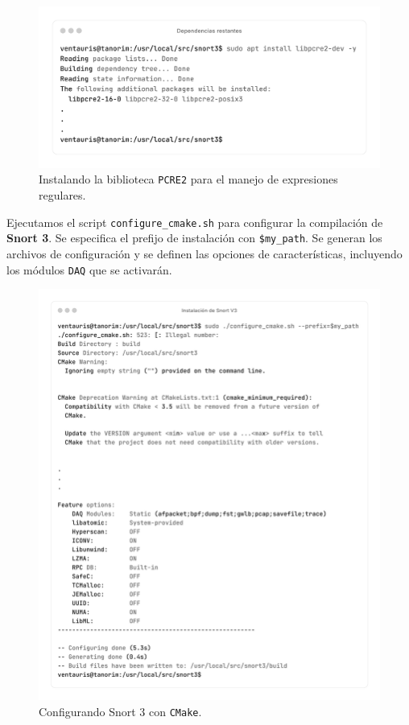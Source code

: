 \documentclass[11pt,a4paper,twoside]{report}
\begin{document}
\begin{figure}[H]
	\centering
	\includegraphics[scale=0.12]{instalacion_snort/20-20.png}
	\caption{Instalando la biblioteca \texttt{PCRE2} para el manejo de expresiones regulares.}
\end{figure}

\newpage

Ejecutamos el script \texttt{configure\_cmake.sh} para configurar la compilación de \textbf{Snort 3}. Se especifica el prefijo de instalación con \texttt{\$my\_path}. Se generan los archivos de configuración y se definen las opciones de características, incluyendo los módulos \texttt{DAQ} que se activarán.

\begin{figure}[H]
	\centering
	\includegraphics[scale=0.12]{instalacion_snort/21-21.png}
	\caption{Configurando Snort 3 con \texttt{CMake}.}
\end{figure}
\end{document}
